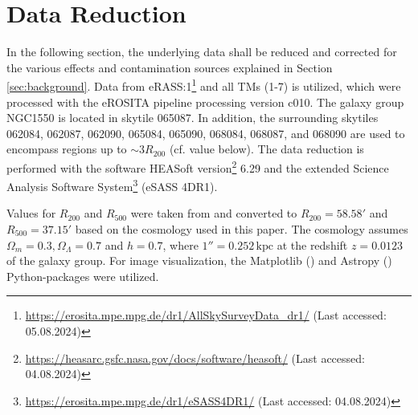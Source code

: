 
\chapter{Data Reduction}
\label{sec:data_reduction}
In the following section, the underlying data shall be reduced and corrected for the various effects and contamination sources explained in Section \ref{sec:background}. Data from eRASS:1\footnote{\url{https://erosita.mpe.mpg.de/dr1/AllSkySurveyData_dr1/} (Last accessed: 05.08.2024)} and all TMs (1-7) is utilized, which were processed with the eROSITA pipeline processing version c010. The galaxy group NGC1550 is located in skytile 065087. In addition, the surrounding skytiles 062084, 062087, 062090, 065084, 065090, 068084, 068087, and 068090 are used to encompass regions up to \(\sim 3R_{200}\) (cf. value below). The data reduction is performed with the software HEASoft version\footnote{\url{https://heasarc.gsfc.nasa.gov/docs/software/heasoft/} (Last accessed: 04.08.2024)} 6.29 and the extended Science Analysis Software System\footnote{\url{https://erosita.mpe.mpg.de/dr1/eSASS4DR1/} (Last accessed: 04.08.2024)} (eSASS 4DR1). 

Values for \(R_{200}\) and \(R_{500}\) were taken from \cite{Reiprich_2002} and converted to \(R_{200} = 58.58'\) and \(R_{500} = 37.15'\) based on the cosmology used in this paper. The cosmology assumes \(\Omega_m = 0.3, \Omega_\Lambda = 0.7\) and \(h = 0.7\), where \(1'' = 0.252\,\text{kpc}\) at the redshift \(z=0.0123\) of the galaxy group. For image visualization, the Matplotlib (\cite{Hunter:2007}) and Astropy (\cite{The_Astropy_Collaboration_2022}) Python-packages  were utilized.
